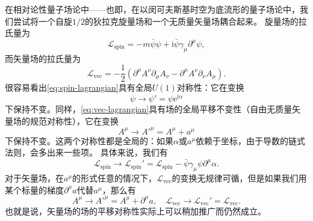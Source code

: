 \documentclass[hyperref, UTF8, a4paper]{ctexart}
\newcommand*{\ii}{\mathrm{i}}
\newcommand*{\ee}{\mathrm{e}}
\begin{document}
在相对论性量子场论中——也即，在以闵可夫斯基时空为底流形的量子场论中，我们尝试将一个自旋$1/2$的狄拉克旋量场和一个无质量矢量场耦合起来。
旋量场的拉氏量为
\begin{equation}
    \mathcal{L}_\text{spin} = - m \bar{\psi} \psi + \ii \bar{\psi} \gamma_\mu \partial^\mu \psi,
    \label{eq:spin-lagrangian}
\end{equation}
而矢量场的拉氏量为
\begin{equation}
    \mathcal{L}_\text{vec} = - \frac{1}{2} (\partial^\mu A^\nu \partial_\mu A_\nu - \partial^\mu A^\nu \partial_\nu A_\mu).
    \label{eq:vec-lagrangian}
\end{equation}
很容易看出\eqref{eq:spin-lagrangian}具有全局$U(1)$对称性：它在变换
\[
    \psi \longrightarrow \psi' = \psi \ee^{\ii \alpha}
\]
下保持不变。同样，\eqref{eq:vec-lagrangian}具有场的全局平移不变性（自由无质量矢量场的规范对称性），它在变换
\[
    A^\mu \longrightarrow A'^\mu = A^\mu + a^\mu
\]
下保持不变。这两个对称性都是全局的：如果$\alpha$或$a^\mu$依赖于坐标，由于导数的链式法则，会多出来一些项。
具体来说，我们有
\begin{equation}
    \mathcal{L}_\text{spin} \longrightarrow \mathcal{L}_\text{spin}' = \mathcal{L}_\text{spin} - \bar{\psi} \gamma_\mu \psi \partial^\mu \alpha.
    \label{eq:psi-change}
\end{equation}
对于矢量场，在$a^\mu$的形式任意的情况下，$\mathcal{L}_\text{vec}$的变换无规律可循，但是如果我们用某个标量的梯度$\partial^\mu a$代替$a^\mu$，那么有
\[
    A^\mu \longrightarrow A'^\mu = A^\mu + \partial^\mu a, \quad
    \mathcal{L}_\text{vec} \longrightarrow \mathcal{L}_\text{vec}' = \mathcal{L}_\text{vec}.
\]
也就是说，矢量场的场的平移对称性实际上可以稍加推广而仍然成立。
\end{document}
